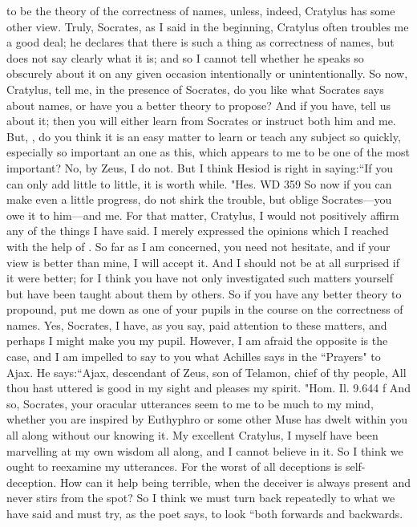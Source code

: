 {{{{{to be the theory of the correctness of names, unless, indeed, Cratylus has some other view.
\hermogenesspeaks
Truly, Socrates, as I said in the beginning, Cratylus often troubles me a good deal; he declares that there is such a thing as correctness of names, but does not say clearly what it is; and so I cannot tell whether he speaks so obscurely about it on any given occasion intentionally or unintentionally.  So now, Cratylus, tell me, in the presence of Socrates, do you like what Socrates says about names, or have you a better theory to propose? And if you have, tell us about it; then you will either learn from Socrates or instruct both him and me.
\cratylusspeaks
But, \hermogenesspeaks, do you think it is an easy matter to learn or teach any subject so quickly, especially so important an one as this, which appears to me to be one of the most important? 
\hermogenesspeaks
No, by Zeus, I do not. But I think Hesiod is right in saying:``If you can only add little to little, it is worth while.
"Hes. WD 359 So now if you can make even a little progress, do not shirk the trouble, but oblige Socrates—you owe it to him—and me.
\socratesspeaks
For that matter, Cratylus, I would not positively affirm any of the things I have said. I merely expressed the opinions which I reached with the help of \hermogenesspeaks. So far as I am concerned, you need not hesitate,  and if your view is better than mine, I will accept it. And I should not be at all surprised if it were better; for I think you have not only investigated such matters yourself but have been taught about them by others. So if you have any better theory to propound, put me down as one of your pupils in the course on the correctness of names.
\cratylusspeaks
Yes, Socrates, I have, as you say, paid attention to these matters, and perhaps I might make you my pupil. However, I am afraid the opposite is the case,  and I am impelled to say to you what Achilles says in the ``Prayers" to Ajax. He says:``Ajax, descendant of Zeus, son of Telamon, chief of thy people,
All thou hast uttered is good in my sight and pleases my spirit.
"Hom. Il. 9.644 f And so, Socrates, your oracular utterances seem to me to be much to my mind, whether you are inspired by Euthyphro or some other Muse has dwelt within you all along without our knowing it. 
\socratesspeaks
My excellent Cratylus, I myself have been marvelling at my own wisdom all along, and I cannot believe in it. So I think we ought to reexamine my utterances. For the worst of all deceptions is self-deception. How can it help being terrible, when the deceiver is always present and never stirs from the spot? So I think we must turn back repeatedly to what we have said and must try, as the poet says, to look ``both forwards and backwards.
}}}}}
